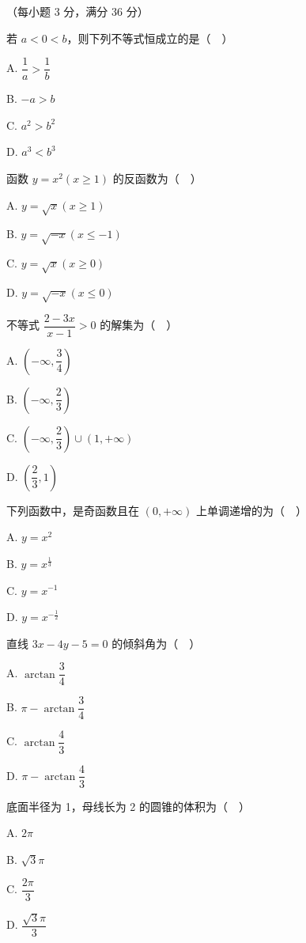 （每小题 3 分，满分 36 分）

\begin{question}
若 \(a<0<b\)，则下列不等式恒成立的是（　）

A. \(\dfrac{1}{a}>\dfrac{1}{b}\)

B. \(-a>b\)

C. \(a^{2}>b^{2}\)

D. \(a^{3}<b^{3}\)

\end{question}
\begin{question}
函数 \(y=x^{2}(x\geqslant 1)\) 的反函数为（　）

A. \(y=\sqrt{x}(x\geqslant 1)\)

B. \(y=\sqrt{-x}(x\leqslant -1)\)

C. \(y=\sqrt{x}(x\geqslant 0)\)

D. \(y=\sqrt{-x}(x\leqslant 0)\)

\end{question}
\begin{question}
不等式 \(\dfrac{2-3x}{x-1}>0\) 的解集为（　）

A. \(\left(-\infty,\dfrac{3}{4}\right)\)

B. \(\left(-\infty,\dfrac{2}{3}\right)\)

C. \(\left(-\infty,\dfrac{2}{3}\right)\cup(1,+\infty)\)

D. \(\left(\dfrac{2}{3},1\right)\)

\end{question}
\begin{question}
下列函数中，是奇函数且在 \((0,+\infty)\) 上单调递增的为（　）

A. \(y=x^{2}\)

B. \(y=x^{\frac{1}{3}}\)

C. \(y=x^{-1}\)

D. \(y=x^{-\frac{1}{2}}\)

\end{question}
\begin{question}
直线 \(3x-4y-5=0\) 的倾斜角为（　）

A. \(\arctan\dfrac{3}{4}\)

B. \(\pi-\arctan\dfrac{3}{4}\)

C. \(\arctan\dfrac{4}{3}\)

D. \(\pi-\arctan\dfrac{4}{3}\)

\end{question}
\begin{question}
底面半径为 1，母线长为 2 的圆锥的体积为（　）

A. \(2\pi\)

B. \(\sqrt{3}\pi\)

C. \(\dfrac{2\pi}{3}\)

D. \(\dfrac{\sqrt{3}\pi}{3}\)

\end{question}
